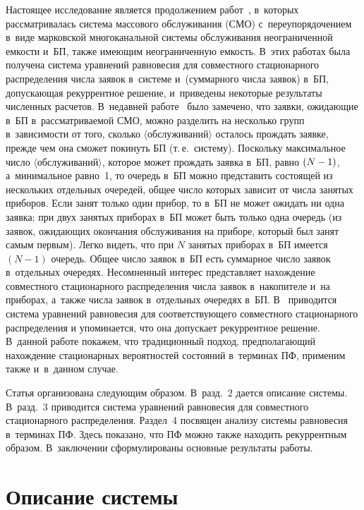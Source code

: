 \begin{multicols}{2}
Настоящее исследование является продолжением работ~\cite{p1, a8}, в~которых
рассматривалась система массового обслуживания (СМО) 
с~переупорядочением в~виде марковской многоканальной
системы обслуживания неограниченной ем\-кости и~БП, также имеющим неограниченную
емкость. В~этих работах была получена система уравнений равновесия для
совместного стационарного распределения числа заявок в~системе
и~(суммарного числа заявок) в~БП,
допускающая рекуррентное решение, и~приведены некоторые результаты
численных расчетов. В~недавней работе~\cite{pr2015} было замечено,
что заявки, ожидающие в~БП в~рассматриваемой СМО,
 можно разделить на несколько групп в~зависимости от того, сколько
$\langle$обслуживаний$\rangle$ осталось прождать заявке, прежде чем она
 сможет покинуть БП (т.\,е.\ систему). Поскольку максимальное число $\langle$обслуживаний$\rangle$,
 которое может прождать заявка в~БП, равно $(N\hm-1)$, а~минимальное
 равно~1, то очередь в~БП можно представить состоящей из нескольких
отдельных очередей, общее число которых зависит от числа занятых приборов.
Если занят только один прибор, то в~БП не может ожидать ни одна заявка;
при двух занятых приборах в~БП может быть только одна очередь (из заявок,
ожидающих окончания обслуживания на приборе, который был занят самым первым).
Легко видеть, что при $N$ занятых приборах в~БП имеется $(N-1)$ очередь.
Общее число заявок в~БП есть суммарное число заявок в~отдельных очередях.
Несомненный интерес представляет нахождение
совместного стационарного распределения числа заявок в~накопителе 
и~на приборах, а~также числа заявок в~отдельных очередях в~БП.
В~\cite{pr2015} приводится система уравнений
равновесия для соответствующего совместного стационарного распределения
и упоминается, что она допускает рекуррентное решение.
В~данной работе покажем, что
традиционный подход, предполагающий нахождение
стационарных вероятностей состояний
в~терминах ПФ, применим также и~в~данном \mbox{случае}.

Статья организована следующим образом.
В~разд.~2 дается описание системы.
В~разд.~3 приводится система уравнений равновесия для совместного стационарного
распределения. Раздел~4 посвящен анализу системы равновесия
в~терминах ПФ.
Здесь показано, что ПФ можно также находить рекуррентным образом.
В~заключении сформулированы основные результаты работы.

\section{Описание системы}


\end{multicols}
